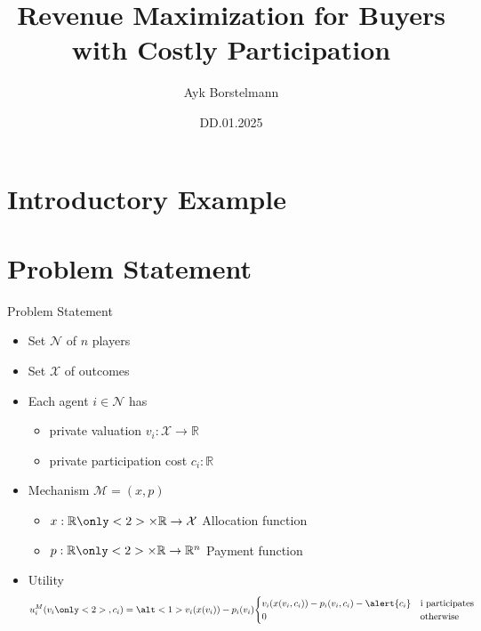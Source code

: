 \documentclass{beamer}
\title{Revenue Maximization for Buyers with Costly Participation}
\date{DD.01.2025}
\author{Ayk Borstelmann}
\institute{
    Seminar Algorithmic Game Theory
}
\begin{document}
\maketitle
\section{Introductory Example}
\section{Problem Statement}
\begin{frame}{Problem Statement}
  \begin{itemize}
    \item Set $\mathcal{N}$ of $n$ players
    \item Set $\mathcal{X}$ of outcomes
    \item Each agent $i \in \mathcal{N}$ has
          \begin{itemize}
            \item private valuation $v_i: \mathcal{X} \rightarrow \mathbb{R}$
            \item<2-> \alert{private participation cost $c_i: \mathbb{R}$}
          \end{itemize}
    \item Mechanism $\mathcal{M} = (x,p)$
          \begin{itemize}
            \item $x: \mathbb{R} \only<2>{\times \mathbb{R}} \rightarrow \mathcal{X}$ Allocation function
            \item $p: \mathbb{R} \only<2>{\times \mathbb{R}} \rightarrow \mathbb{R}^n$ Payment function
          \end{itemize}
    \item Utility
          \begin{align*}
            u_i^M(v_i\only<2>{, c_i}) = \alt<1>{v_i(x(v_i)) - p_i(v_i)}{\begin{cases}v_i(x(v_i, c_i)) - p_i(v_i, c_i) - \alert{c_i} & \text{i participates} \\ 0 & \text{otherwise}\end{cases}}
          \end{align*}
  \end{itemize}
\end{frame}
\end{document}
